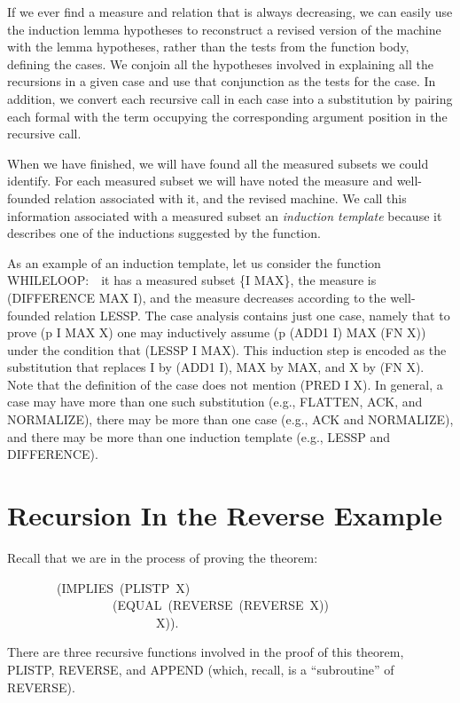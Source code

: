 \documentclass[10pt]{book}
\newenvironment{pubasis}{\begin{flushleft}}{\end{flushleft}}
\begin{document}
If we ever find a measure and relation that is always decreasing, we can easily
use the induction lemma hypotheses to reconstruct a revised version of the machine
with the lemma hypotheses, rather than the tests from the function body,
defining the cases. We   conjoin all the hypotheses
involved in explaining all the recursions in a given case and use that
conjunction as the tests for the case.  In addition, we convert each recursive
call in each case into a substitution by pairing each
formal with the term occupying the corresponding argument
position in the recursive call.

When we have finished, we will have found all the measured subsets
we could identify.  For each measured subset we will have noted
the measure and well-founded relation associated with it,
and the revised machine.
We call this information associated with a measured subset
an \emph{induction template} because it describes one of the inductions
suggested by the function.

As an example of an induction template, let us consider the
function WHILELOOP:~~it has a measured subset \{I MAX\}, the measure
is (DIFFERENCE MAX I), and the measure decreases according to the well-founded
relation LESSP.  The case analysis contains just one case,
namely that to prove (p I MAX X) one may inductively assume (p (ADD1 I) MAX (FN X))
under the condition that (LESSP I MAX).  This induction step is
encoded as the substitution that replaces I by (ADD1 I),
MAX by MAX, and X by (FN X).  Note that the definition of the case
does not mention (PRED I X).  In general, a case may have
more than one such substitution (e.g., FLATTEN, ACK, and
NORMALIZE), there may be more than one case (e.g., ACK and NORMALIZE),
and there may be more than one induction template (e.g., LESSP and DIFFERENCE).

\section{Recursion In the Reverse Example}
Recall that we are in the process of proving the theorem:

\begin{pubasis}
~~~~~~~~(IMPLIES~(PLISTP~X)\\
~~~~~~~~~~~~~~~~~(EQUAL~(REVERSE~(REVERSE~X))\\
~~~~~~~~~~~~~~~~~~~~~~~~X)).\\
\end{pubasis}
There are three recursive functions involved in the proof of this
theorem, PLISTP, REVERSE, and APPEND (which, recall, is a ``subroutine'' of
REVERSE).
\end{document}
